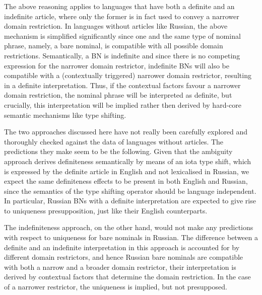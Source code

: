 \documentclass[output=paper,colorlinks,citecolor=brown]{langscibook}
\begin{document}
The above reasoning applies to languages that have both a definite and an indefinite article, where only the former is in fact used to convey a narrower domain restriction. In languages without articles like Russian, the above mechanism is simplified significantly since one and the same type of nominal phrase, namely, a bare nominal, is compatible with all possible domain restrictions. Semantically, a BN is indefinite and since there is no competing expression for the narrower domain restrictor, indefinite BNs will also be compatible with a (contextually triggered) narrower domain restrictor, resulting in a definite interpretation. Thus, if the contextual factors favour a narrower domain restriction, the nominal phrase will be interpreted as definite, but crucially, this interpretation will be implied rather then derived by hard-core semantic mechanisms like type shifting. 

The two approaches discussed here have not really been carefully explored and thoroughly checked against the data of languages without articles. The predictions they make seem to be the following. Given that the ambiguity approach derives definiteness semantically by means of an iota type shift, which is expressed by the definite article in English and not lexicalised in Russian, we expect the same definiteness effects to be present in both English and Russian, since the semantics of the type shifting operator should be language independent. In particular, Russian BNs with a definite interpretation are expected to give rise to uniqueness presupposition, just like their English counterparts. 
 
The indefiniteness approach, on the other hand, would not make any predictions with respect to uniqueness for bare nominals in Russian. The difference between a definite and an indefinite interpretation in this approach is accounted for by different domain restrictors, and hence Russian bare nominals are compatible with both a narrow and a broader domain restrictor, their interpretation is derived by contextual factors that determine the domain restriction. In the case of a narrower restrictor, the uniqueness is implied, but not presupposed. 
\end{document}
